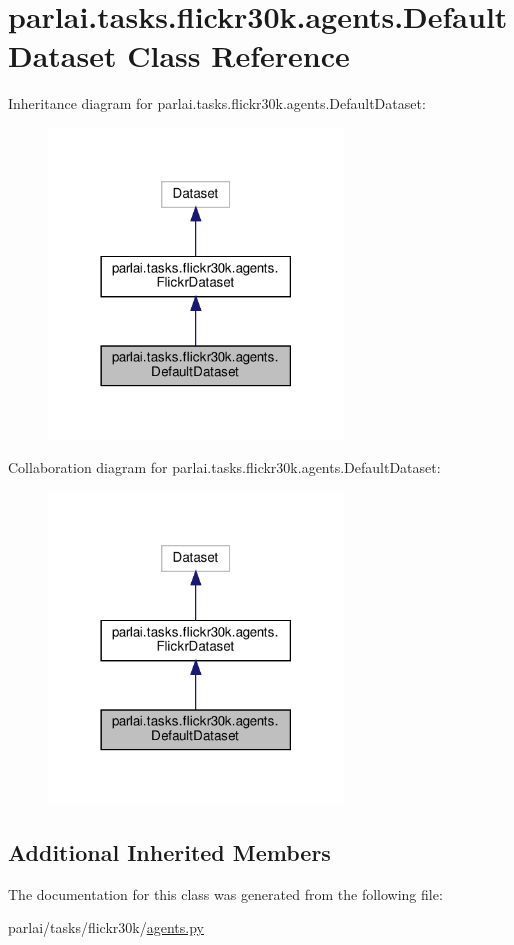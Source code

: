 \hypertarget{classparlai_1_1tasks_1_1flickr30k_1_1agents_1_1DefaultDataset}{}\section{parlai.\+tasks.\+flickr30k.\+agents.\+Default\+Dataset Class Reference}
\label{classparlai_1_1tasks_1_1flickr30k_1_1agents_1_1DefaultDataset}


Inheritance diagram for parlai.\+tasks.\+flickr30k.\+agents.\+Default\+Dataset\+:
\nopagebreak
\begin{figure}[H]
\begin{center}
\leavevmode
\includegraphics[width=222pt]{classparlai_1_1tasks_1_1flickr30k_1_1agents_1_1DefaultDataset__inherit__graph}
\end{center}
\end{figure}


Collaboration diagram for parlai.\+tasks.\+flickr30k.\+agents.\+Default\+Dataset\+:
\nopagebreak
\begin{figure}[H]
\begin{center}
\leavevmode
\includegraphics[width=222pt]{classparlai_1_1tasks_1_1flickr30k_1_1agents_1_1DefaultDataset__coll__graph}
\end{center}
\end{figure}
\subsection*{Additional Inherited Members}


The documentation for this class was generated from the following file\+:\begin{DoxyCompactItemize}
\item 
parlai/tasks/flickr30k/\hyperlink{parlai_2tasks_2flickr30k_2agents_8py}{agents.\+py}\end{DoxyCompactItemize}
